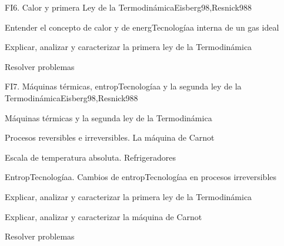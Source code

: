 \begin{syllabus}
\begin{unit}{FI6. Calor y primera Ley de la Termodinámica}{Eisberg98,Resnick98}{8}
   \begin{unitgoals}
         \item  Entender el concepto de calor y de energTecnologíaa interna de un gas ideal
         \item  Explicar, analizar y caracterizar la primera ley de la Termodinámica
         \item  Resolver problemas
   \end{unitgoals}
\end{unit}

\begin{unit}{FI7. Máquinas térmicas, entropTecnologíaa y la segunda ley de la Termodinámica}{Eisberg98,Resnick98}{8}
\begin{topics}
         \item  Máquinas térmicas y la segunda ley de la Termodinámica
	 \item  Procesos reversibles e irreversibles. La máquina de Carnot
         \item  Escala de temperatura absoluta. Refrigeradores
	 \item  EntropTecnologíaa. Cambios de entropTecnologíaa en procesos irreversibles
   \end{topics}

   \begin{unitgoals}
         \item  Explicar, analizar y caracterizar la primera ley de la Termodinámica
         \item  Explicar, analizar y caracterizar la máquina de Carnot
         \item  Resolver problemas
   \end{unitgoals}
\end{unit}

\begin{coursebibliography}
\end{coursebibliography}

\end{syllabus}

%
